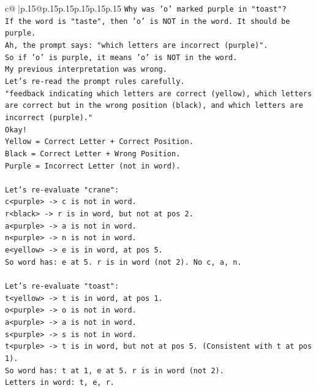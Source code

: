 \documentclass{article}
\begin{document}
{\begin{supertabular}{c@{$\;$}|p{.15\linewidth}@{}p{.15\linewidth}p{.15\linewidth}p{.15\linewidth}p{.15\linewidth}p{.15\linewidth}}
{{{\texttt{Why was 'o' marked purple in "toast"?} \\
\texttt{If the word is "taste", then 'o' is NOT in the word. It should be purple.} \\
\texttt{Ah, the prompt says: "which letters are incorrect (purple)".} \\
\texttt{So if 'o' is purple, it means 'o' is NOT in the word.} \\
\texttt{My previous interpretation was wrong.} \\
\texttt{Let's re{-}read the prompt rules carefully.} \\
\texttt{"feedback indicating which letters are correct (yellow), which letters are correct but in the wrong position (black), and which letters are incorrect (purple)."} \\
\texttt{Okay!} \\
\texttt{Yellow = Correct Letter + Correct Position.} \\
\texttt{Black = Correct Letter + Wrong Position.} \\
\texttt{Purple = Incorrect Letter (not in word).} \\
\\ 
\texttt{Let's re{-}evaluate "crane":} \\
\texttt{c<purple> {-}> c is not in word.} \\
\texttt{r<black> {-}> r is in word, but not at pos 2.} \\
\texttt{a<purple> {-}> a is not in word.} \\
\texttt{n<purple> {-}> n is not in word.} \\
\texttt{e<yellow> {-}> e is in word, at pos 5.} \\
\texttt{So word has: e at 5. r is in word (not 2). No c, a, n.} \\
\\ 
\texttt{Let's re{-}evaluate "toast":} \\
\texttt{t<yellow> {-}> t is in word, at pos 1.} \\
\texttt{o<purple> {-}> o is not in word.} \\
\texttt{a<purple> {-}> a is not in word.} \\
\texttt{s<purple> {-}> s is not in word.} \\
\texttt{t<purple> {-}> t is in word, but not at pos 5. (Consistent with t at pos 1).} \\
\texttt{So word has: t at 1, e at 5. r is in word (not 2).} \\
\texttt{Letters in word: t, e, r.} \\
}}}
\end{supertabular}}
\end{document}
